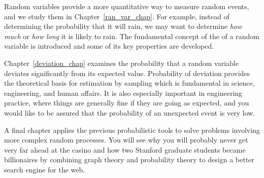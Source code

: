 Random variables provide a more quantitative way to measure random
events, and we study them in Chapter~\ref{ran_var_chap}.  For example,
instead of determining the probability that it will rain, we may want
to determine \emph{how much} or \emph{how long} it is likely to rain.
The fundamental concept of the  of a random
variable is introduced and some of its key properties are developed.

Chapter~\ref{deviation_chap} examines the probability that a random
variable deviates significantly from its expected value.  Probability
of deviation provides the theoretical basis for estimation by sampling
which is fundamental in science, engineering, and human affairs.  It
is also especially important in engineering practice, where things are
generally fine if they are going as expected, and you would like to be
assured that the probability of an unexpected event is very low.


A final chapter applies the previous probabilistic tools to solve
problems involving more complex random processes.  You will see why
you will probably never get very far ahead at the casino and how two
Stanford graduate students became billionaires by combining graph
theory and probability theory to design a better search engine for the
web.

\endinput
